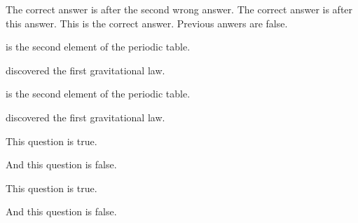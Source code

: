 \documentclass{exam}
\newcommand{\tf}[1][{}]{%
   \fillin[#1][0.25in]%
}
\begin{document}
\begin{questions}
   \begin{checkboxes}
     \choice The correct answer is after the second wrong answer.
     \choice The correct answer is after this answer.
     \choice This is the correct answer.
     \CorrectChoice Previous anwers are false.
   \end{checkboxes}

 \setcounter{question}{0}

  \question \fillin[Helium] is the second element of the periodic table.



  \question {} discovered the first gravitational law.
  \printanswers

  \question \fillin[Helium] is the second element of the periodic table.


  \question {} discovered the first gravitational law.


  \question \tf[T] This question is true.

  \question \tf[F] And this question is false.
  \printanswers

  \question \tf[T] This question is true.

  \question \tf[F] And this question is false.

\end{questions}
\end{document}
